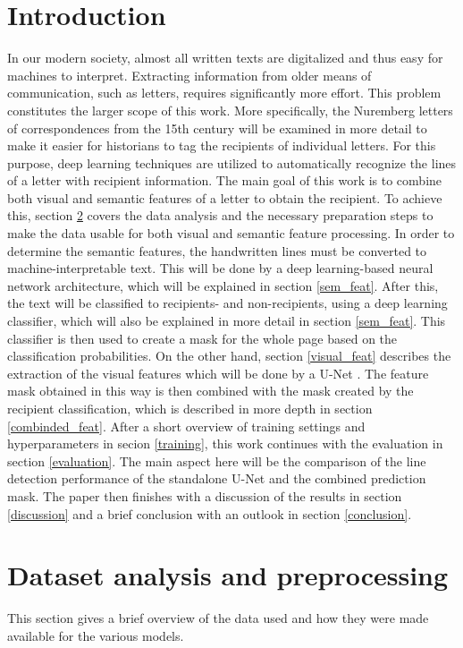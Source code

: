 \documentclass[conference]{IEEEtran}
\begin{document}
\section{Introduction}
In our modern society, almost all written texts are digitalized and thus easy for machines to interpret. Extracting information from older means of communication, such as letters, requires significantly more effort. This problem constitutes the larger scope of this work. More specifically, the Nuremberg letters of correspondences from the 15th century will be examined in more detail to make it easier for historians to tag the recipients of individual letters. For this purpose, deep learning techniques are utilized to automatically recognize the lines of a letter with recipient information. The main goal of this work is to combine both visual and semantic features of a letter to obtain the recipient. \newline
To achieve this, section \ref{data} covers the data analysis and the necessary preparation steps to make the data usable for both visual and semantic feature processing. In order to determine the semantic features, the handwritten lines must be converted to machine-interpretable text. This will be done by a deep learning-based neural network architecture, which will be explained in section \ref{sem_feat}. After this, the text will be classified to recipients- and non-recipients, using a deep learning classifier, which will also be explained in more detail in section \ref{sem_feat}. This classifier is then used to create a mask for the whole page based on the classification probabilities. On the other hand, section \ref{visual_feat} describes the extraction of the visual features which will be done by a U-Net \cite{ronneberger2015unet}. The feature mask obtained in this way is then combined with the mask created by the recipient classification, which is described in more depth in section \ref{combinded_feat}. After a short overview of training settings and hyperparameters in secion \ref{training}, this work continues with the evaluation in section \ref{evaluation}. The main aspect here will be the comparison of the line detection performance of the standalone U-Net and the combined prediction mask. The paper then finishes with a discussion of the results in section \ref{discussion} and a brief conclusion with an outlook in section \ref{conclusion}.

\section{Dataset analysis and preprocessing}\label{data}
This section gives a brief overview of the data used and how they were made available for the various models.
\end{document}
